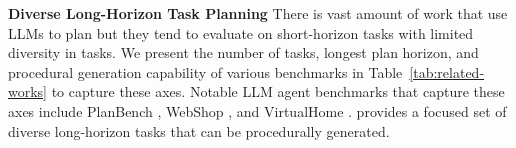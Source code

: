 \textbf{Diverse Long-Horizon Task Planning}
There is vast amount of work that use LLMs to plan \citep{ahn2022icanisay,huang2022innermonologueembodiedreasoning,zeng2022socraticmodelscomposingzeroshot,liang2023codepolicieslanguagemodel,singh2022progpromptgeneratingsituatedrobot,song2023llmplannerfewshotgroundedplanning,yang2023couplinglargelanguagemodels,song2023llmplannerfewshotgroundedplanning} but they tend to evaluate on short-horizon tasks with limited diversity in tasks. We present the number of tasks, longest plan horizon, and procedural generation capability of various benchmarks in Table~\ref{tab:related-works} to capture these axes. Notable LLM agent benchmarks that capture these axes include PlanBench \citep{valmeekam2023planbenchextensiblebenchmarkevaluating}, WebShop \citep{yao2023webshopscalablerealworldweb}, and VirtualHome \citep{puig2018virtualhomesimulatinghouseholdactivities}. \robotouille{} provides a focused set of diverse long-horizon tasks that can be procedurally generated.



